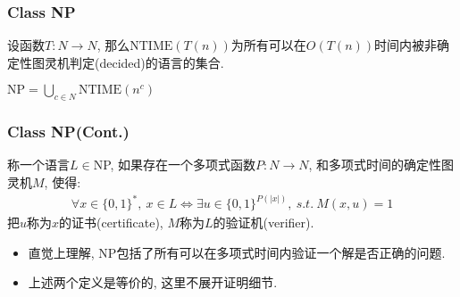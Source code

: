 \begin{frame}
    \frametitle{Class NP}
    \begin{definition}
        设函数$T: N\rightarrow N$, 那么$\text{NTIME}(T(n))$为所有可以在$O(T(n))$时间内被非确定性图灵机判定(decided)的语言的集合.
    \end{definition}
    \begin{definition}[Class NP]
        $\text{NP} = \bigcup_{c\in N} \text{NTIME}(n^c)$
    \end{definition}
\end{frame}
\begin{frame}
    \frametitle{Class NP(Cont.)}
    \begin{definition}
        称一个语言$L \in $NP, 如果存在一个多项式函数$P: N \rightarrow N$, 和多项式时间的确定性图灵机$M$, 使得:
        \begin{align*}
            \forall x \in \{0,1\}^*, ~x\in L \iff \exists u \in \{0,1\}^{P(|x|)}, ~s.t.~ M(x,u) = 1
        \end{align*}
        把$u$称为$x$的证书(certificate), $M$称为$L$的验证机(verifier).
    \end{definition}
    \pause
    \begin{itemize}
        \item 直觉上理解, NP包括了所有可以在多项式时间内验证一个解是否正确的问题.
        \item 上述两个定义是等价的, 这里不展开证明细节.
    \end{itemize}
    

\end{frame}
